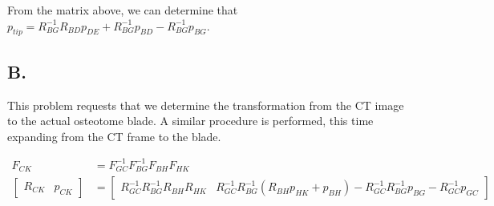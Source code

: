 \documentclass[letterpaper, 11pt]{article}
\begin{document}
From the matrix above, we can determine that $p_{tip} = R_{BG}^{-1}R_{BD}p_{DE} + R_{BG}^{-1}p_{BD}-R_{BG}^{-1}p_{BG}$.
\subsection*{B.}
This problem requests that we determine the transformation from the CT image to the actual osteotome blade. A similar procedure is performed, this time expanding from the CT frame to the blade.

\begin{align}
	F_{CK} &= F_{GC}^{-1}F_{BG}^{-1}F_{BH}F_{HK} \\
    \begin{bmatrix} R_{CK} & p_{CK} \end{bmatrix} &= \begin{bmatrix} R_{GC}^{-1}R_{BG}^{-1}R_{BH}R_{HK} & R_{GC}^{-1}R_{BG}^{-1}(R_{BH}p_{HK} + p_{BH}) - R_{GC}^{-1}R_{BG}^{-1}p_{BG}-R_{GC}^{-1}p_{GC} \end{bmatrix}
\end{align}

\end{document}
